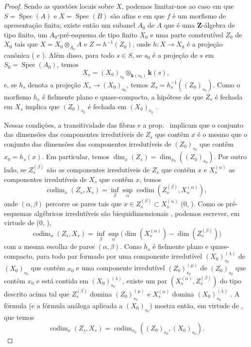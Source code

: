 \begin{proof}
\label{IV.9.9.1-proof}
Sendo as questões locais sobre $X$, podemos limitar-nos ao caso em que $S=\operatorname{Spec}(A)$ e $X=\operatorname{Spec}(B)$ são afins e em que $f$ é um morfismo de apresentação finita; existe então um subanel $A_0$ de $A$ que é uma $\mathbf{Z}$-álgebra de tipo finito, um $A_0$-pré-esquema de tipo finito $X_0$ e uma parte construtível $Z_0$ de $X_0$ tais que $X=X_0\otimes_{A_0}A$ e $Z=h^{-1}(Z_0)$, onde $h:X\to X_0$ é a projeção canônica ( e ).
Além disso, para todo $s\in S$, se $s_0$ é a projeção de $s$ em $S_0=\operatorname{Spec}(A_0)$, temos
\[
  X_s=(X_0)_{s_0}\otimes_{\mathbf{k}(s_0)}\mathbf{k}(s),
\]
e, se $h_s$ denota a projeção $X_s\to(X_0)_{s_0}$, temos $Z_s=h_s^{-1}((Z_0)_{s_0})$.
Como o morfismo $h_s$ é fielmente plano e quase-compacto, a hipótese de que $Z_s$ é fechada em $X_s$ implica que $(Z_0)_{s_0}$ é fechada em $(X_0)_{s_0}$ .

Nessas condições, a transitividade das fibras  e a prop.~ implicam que o conjunto das dimensões das componentes irredutíveis de $Z_s$ que contêm $x$ é o mesmo que o conjunto das dimensões das componentes irredutíveis de $(Z_0)_{s_0}$ que contêm $x_0=h_s(x)$.
Em particular, temos $\dim_x(Z_s)=\dim_{x_0}((Z_0)_{s_0})$.
Por outro lado, se $Z_s^{(\beta)}$ são as componentes irredutíveis de $Z_s$ que contêm $x$ e $X_s^{(\alpha)}$ as componentes irredutíveis de $X_s$
que contêm $x$, temos
\[
  \operatorname{codim}_x(Z_s,X_s)
  =\inf_{\beta}\sup_{\alpha}\operatorname{codim}(Z_s^{(\beta)},X_s^{(\alpha)}),
\]
onde $(\alpha,\beta)$ percorre os pares tais que $x\in Z_s^{(\beta)}\subset X_s^{(\alpha)}$ ($0$, ).
Como os pré-esquemas algébricos irredutíveis são biequidimensionais , podemos escrever, em virtude de ($0$, ),
\begin{equation}
\tag{9.9.1.1}
\label{IV.9.9.1.1}
  \operatorname{codim}_x(Z_s,X_s)=\inf_{\beta}\sup_{\alpha}\bigl(\dim(X_s^{(\alpha)})-\dim(Z_s^{(\beta)})\bigr)
\end{equation}
com a mesma escolha de pares $(\alpha,\beta)$.
Como $h_s$ é fielmente plano e quase-compacto, para todo par formado por uma componente irredutível $(X_0)_{s_0}^{(\lambda)}$ de $(X_0)_{s_0}$ que contém $x_0$ e uma componente irredutível $(Z_0)_{s_0}^{(\mu)}$ de $(Z_0)_{s_0}$ que contém $x_0$ e está contida em $(X_0)_{s_0}^{(\lambda)}$, existe um par $(X_s^{(\alpha)},Z_s^{(\beta)})$ do tipo descrito acima tal que $Z_s^{(\beta)}$ domina $(Z_0)_{s_0}^{(\mu)}$ e $X_s^{(\alpha)}$ domina $(X_0)_{s_0}^{(\lambda)}$ .
A fórmula  (e a fórmula análoga aplicada a $(X_0)_{s_0}$) mostra então, em virtude de , que temos
\[
  \operatorname{codim}_x(Z_s,X_s)=\operatorname{codim}_{x_0}((Z_0)_{s_0},(X_0)_{s_0}).
\]


\end{proof}

